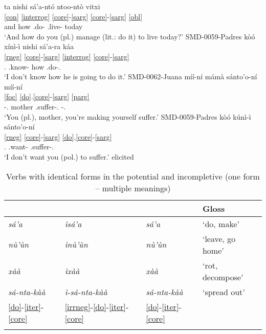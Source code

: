 \documentclass[output=paper]{langscibook}
\begin{document}
\ea 
\ea \label{ex:oneform1}
\glll  ta nishi sá'a-ntó ntoo-ntò vitxi \\
\ref{con} \ref{interrog} \ref{core}-\ref{sarg} \ref{core}-\ref{sarg} \ref{obl} \\
and how \Incmpl.do-\Spl{} \Pot.live-\Spl{} today \\
\glt `And how do you (pl.) manage (lit.: do it) to live today?' \hfill SMD-0059-Padres
\ex \label{ex:oneform2}
\glll kòó xínì-ì nishi sá'a-ra káa  \\
\ref{rneg} \ref{core}-\ref{sarg} \ref{interrog} \ref{core}-\ref{sarg} {} \\
\Neg.\Real{} \Incmpl.know-\Fsg{} how \Pot.do-\Tsg.\M{} \Dem{}  \\
\glt `I don't know how he is going to do it.' \hfill SMD-0062-Juana
\ex \label{ex:oneform3}
\glll míí-ní mámà sánto'o-ní míí-ní \\
\ref{foc} {} \ref{do}.\ref{core}-\ref{sarg} \ref{parg} \\
\Top-\Ssg.\Hon{} mother \Caus.suffer-\Ssg.\Hon{} \Top-\Ssg.\Hon{} \\
\glt `You (pl.), mother, you're making yourself suffer.' \hfill SMD-0059-Padres
\ex \label{ex:oneform4}
\glll kòó kúnì-ì sánto'o-ní \\
\ref{rneg} \ref{core}-\ref{sarg} \ref{do}.\ref{core}-\ref{sarg} \\
\Neg.\Real{} \Incmpl.want-\Fsg{} \Caus.suffer-\Ssg.\Hon{} \\
\glt `I don't want you (pol.) to suffer.' \hfill elicited
\z
\z

\begin{table}
	\caption{Verbs with identical forms in the potential and incompletive (one form -- multiple meanings)}
	\label{tab:oneform}
	\begin{tabularx}{\textwidth}{XXXl} \lsptoprule
		\Incmpl{}                & \Cmpl{}              & \Pot{}               & Gloss \\ \midrule
		\textit{sá'a} 		& \textit{ìsá'a} 	& \textit{sá'a}	& `do, make'  	 \\
		\textit{nù'ùn}      & \textit{ìnù'ùn} 	& \textit{nù'ùn} 	& `leave, go home' 	 \\ 
		\textit{xàà}	 	& \textit{ìxàà} 	& \textit{xàà}	 	& `rot, decompose' 	 \\
		\textit{sá-nta-kàà} 		& \textit{ì-sá-nta-kàà} 	& \textit{sá-nta-kàà} 	& `spread out' \\ 
		\ref{do}-\ref{iter}-\ref{core} & \ref{irrneg}-\ref{do}-\ref{iter}-\ref{core} & \ref{do}-\ref{iter}-\ref{core} & \\ \lspbottomrule
	\end{tabularx}
\end{table}
\end{document}
